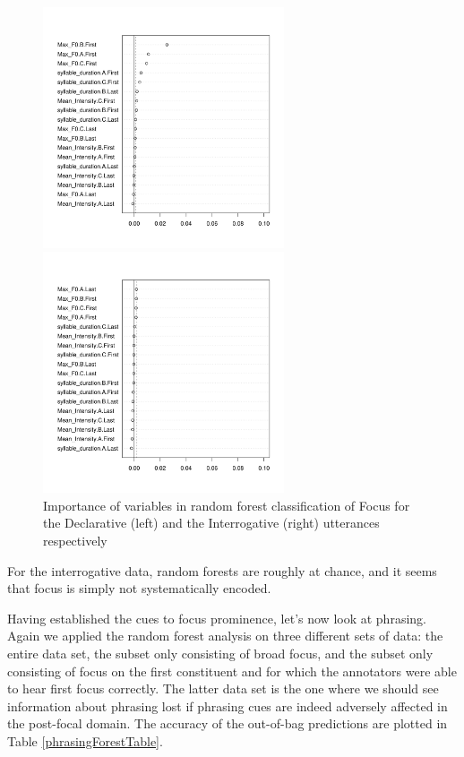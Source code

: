 \documentclass[preprint,review,12pt,authoryear,times]{elsarticle}
\begin{document}
\begin{figure}[ht!]
	\begin{center}	     
	        \parbox{2.8in}{
		\includegraphics[width=2.8in]{Figures/FocusVarimpDec.pdf}
		}\parbox{2.8in}{
		\includegraphics[width=2.8in]{Figures/FocusVarimpInt.pdf}
		}
	     \caption{Importance of variables in random forest classification of Focus for the Declarative (left) and the Interrogative (right) utterances respectively}
	     \label{FocusForest}
	\end{center}
\end{figure}

For the interrogative data, random forests are roughly at chance, and it seems that focus is simply not systematically encoded. 

Having established the cues to focus prominence, let's now look at phrasing. Again we applied the random forest analysis on three different sets of data: the entire data set, the subset only consisting of broad focus, and the subset only consisting of focus on the first constituent and for which the annotators were able to hear first focus correctly. The latter data set is the one where we should see information about phrasing lost if phrasing cues are indeed adversely affected in the post-focal domain. The accuracy of the out-of-bag predictions are plotted in Table \ref{phrasingForestTable}.
\end{document}

